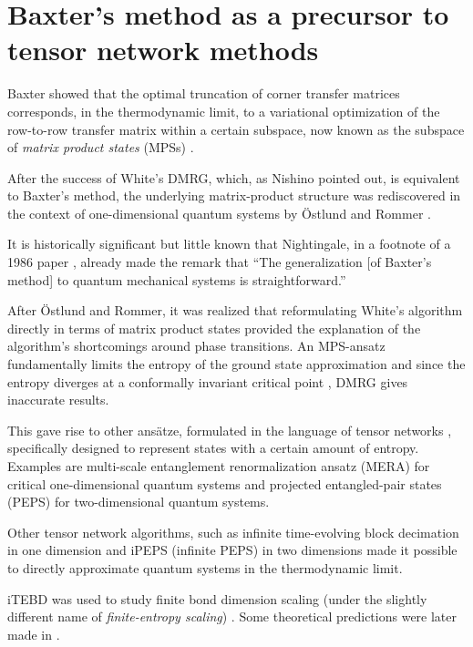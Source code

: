 \section{Baxter's method as a precursor to tensor network methods}

Baxter showed that the optimal truncation of corner transfer matrices
corresponds, in the thermodynamic limit, to a variational optimization of
the row-to-row transfer matrix within a certain subspace, now known as the
subspace of \emph{matrix product states} (MPSs) \cite{baxter1968dimers,
baxter1982exactly_ctm}.

After the success of White's DMRG, which, as Nishino pointed out, is equivalent
to Baxter's method, the underlying matrix-product structure was rediscovered in
the context of one-dimensional quantum systems by Östlund and Rommer
\cite{ostlund1995thermodynamic, rommer1997class}.

It is historically significant but little known that Nightingale, in
a footnote of a 1986 paper \cite{nightingale1986gap}, already made the
remark that \enquote{The generalization [of Baxter's method] to quantum
mechanical systems is straightforward.}

After Östlund and Rommer, it was realized that reformulating White's
algorithm directly in terms of matrix product states provided the
explanation of the algorithm's shortcomings around phase transitions. An
MPS-ansatz fundamentally limits the entropy of the ground state
approximation and since the entropy diverges at a conformally invariant
critical point \cite{calabrese2004entanglement}, DMRG gives inaccurate
results.

This gave rise to other ansätze, formulated in the language of tensor
networks \cite{orus2014practical}, specifically designed to represent
states with a certain amount of entropy. Examples are multi-scale
entanglement renormalization ansatz (MERA) for critical one-dimensional
quantum systems \cite{vidal2007entanglement} and projected entangled-pair
states (PEPS) \cite{verstraete2004renormalization}
for two-dimensional quantum systems.

Other tensor network algorithms, such as infinite time-evolving block
decimation \cite{vidal2007classical} in one dimension and iPEPS (infinite
PEPS) \cite{jordan2008classical} in two dimensions made it possible to
directly approximate quantum systems in the thermodynamic limit.

iTEBD was used to study finite bond dimension scaling (under the slightly
different name of \emph{finite-entropy scaling})
\cite{tagliacozzo2008scaling}. Some theoretical predictions were later
made in \cite{pollmann2009theory}.

